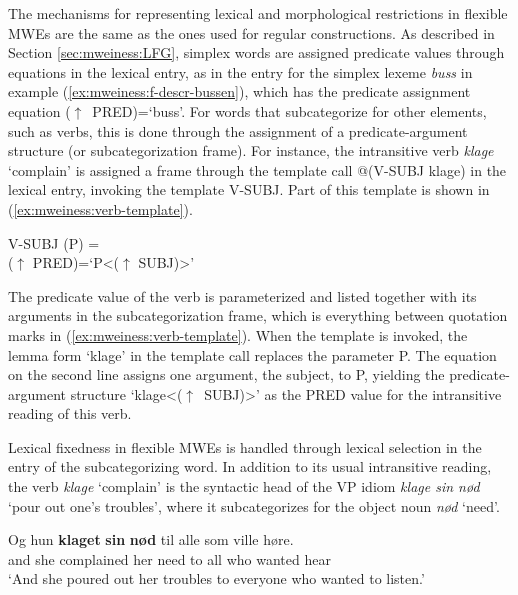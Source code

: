 \documentclass[output=paper]{langsci/langscibook}
\begin{document}
The mechanisms for representing lexical and morphological restrictions in flexible MWEs are the same as the ones used for regular constructions.
As described in Section \ref{sec:mweiness:LFG}, simplex words are assigned predicate values through equations in the lexical entry, as in the entry for the simplex lexeme \emph{buss} in example (\ref{ex:mweiness:f-descr-bussen}), which has the predicate assignment equation ($\uparrow$~PRED)=`buss'. 
For words that subcategorize for other elements, such as verbs, this is done through the assignment of a predicate-argument structure (or subcategorization frame). 
For instance, the intransitive verb \emph{klage} `complain' is assigned a frame through the template call @(V-SUBJ klage) in the lexical entry, invoking the template V-SUBJ. 
Part of this template is shown in (\ref{ex:mweiness:verb-template}).

\ea\label{ex:mweiness:verb-template}
{\small 
 V-SUBJ (P) = \\
\hspace{2em} ($\uparrow$ PRED)=`P<($\uparrow$ SUBJ)>' \\
}
\z

The predicate value of the verb is parameterized and listed together with its arguments in the subcategorization frame, which is everything between quotation marks in (\ref{ex:mweiness:verb-template}).
When the template is invoked, the lemma form `klage' in the template call replaces the parameter P. 
The equation on the second line assigns one argument, the subject, to P, yielding the predicate-argument  structure `klage<($\uparrow$~SUBJ)>' as the PRED value for the intransitive reading of this verb.


Lexical fixedness in flexible MWEs is handled through lexical selection in the entry of the subcategorizing word. 
In addition to its usual intransitive reading, the verb \emph{klage} `complain' is the syntactic head of the VP idiom \emph{klage sin nød} `pour out one's troubles', where it subcategorizes for the object noun \emph{nød} `need'. 

 \ea\label{ex:mweiness:klagesinnød}
\gll Og hun \textbf{klaget} \textbf{sin} \textbf{nød} til alle som ville høre. \\
     and she complained her need to all who wanted hear \\
\glt `And she poured out her troubles to everyone who wanted to listen.’
\z
\end{document}
